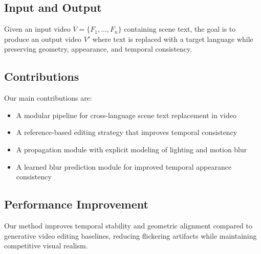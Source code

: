 \subsection{Input and Output}

Given an input video $V = \{F_1, ..., F_n\}$ containing scene text, the goal is to produce an output video $V'$ where text is replaced with a target language while preserving geometry, appearance, and temporal consistency.

\subsection{Contributions}

Our main contributions are:
\begin{itemize}
    \item A modular pipeline for cross-language scene text replacement in video
    \item A reference-based editing strategy that improves temporal consistency
    \item A propagation module with explicit modeling of lighting and motion blur
    \item A learned blur prediction module for improved temporal appearance consistency
\end{itemize}

\subsection{Performance Improvement}

Our method improves temporal stability and geometric alignment compared to generative video editing baselines, reducing flickering artifacts while maintaining competitive visual realism.